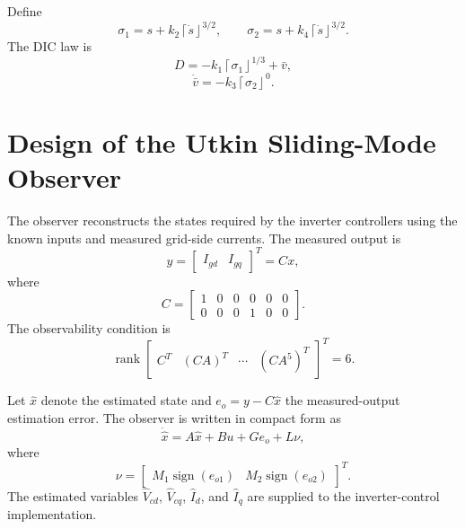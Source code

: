 \documentclass[preprint,12pt]{elsarticle}
\begin{document}
Define
\begin{equation}
\sigma_1=s+k_2\left\lceil\dot s\right\rfloor^{3/2},\qquad
\sigma_2=s+k_4\left\lceil\dot s\right\rfloor^{3/2}.
\end{equation}
The DIC law is
\begin{equation}
D=-k_1\left\lceil\sigma_1\right\rfloor^{1/3}+\bar v,
\label{eq:dic-mppt}
\end{equation}
\begin{equation}
\dot{\bar v}=-k_3\left\lceil\sigma_2\right\rfloor^0.
\label{eq:dic-vbar}
\end{equation}

\section{Design of the Utkin Sliding-Mode Observer}
\label{sec:observer}

The observer reconstructs the states required by the inverter controllers using the known inputs and measured grid-side currents. The measured output is
\begin{equation}
y=\begin{bmatrix}I_{gd}&I_{gq}\end{bmatrix}^{T}=Cx,
\end{equation}
where
\begin{equation}
C=\begin{bmatrix}1&0&0&0&0&0\\0&0&0&1&0&0\end{bmatrix}.
\end{equation}
The observability condition is
\begin{equation}
\operatorname{rank}\begin{bmatrix}C^T&(CA)^T&\cdots&(CA^5)^T\end{bmatrix}^{T}=6.
\end{equation}

Let $\hat x$ denote the estimated state and $e_o=y-C\hat x$ the measured-output estimation error. The observer is written in compact form as
\begin{equation}
\dot{\hat x}=A\hat x+Bu+Ge_o+L\nu,
\label{eq:observer-compact}
\end{equation}
where
\begin{equation}
\nu=\begin{bmatrix}M_1\operatorname{sign}(e_{o1})&M_2\operatorname{sign}(e_{o2})\end{bmatrix}^{T}.
\end{equation}
The estimated variables $\hat V_{cd}$, $\hat V_{cq}$, $\hat I_d$, and $\hat I_q$ are supplied to the inverter-control implementation.
\end{document}
